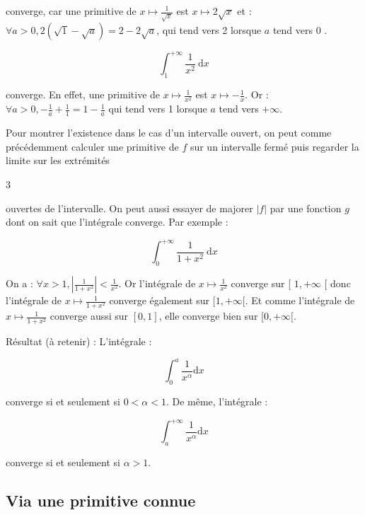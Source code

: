 converge, car une primitive de $x \mapsto \frac{1}{\sqrt{x}}$ est $x \mapsto 2 \sqrt{x}$ et : $\forall a>0,2(\sqrt{1}-\sqrt{a})=2-2 \sqrt{a}$, qui tend vers 2 lorsque $a$ tend vers 0 .

$$
\int_1^{+\infty} \frac{1}{x^2} \mathrm{~d} x
$$

converge. En effet, une primitive de $x \mapsto \frac{1}{x^2}$ est $x \mapsto-\frac{1}{x}$. Or : $\forall a>0,-\frac{1}{a}+\frac{1}{1}=1-\frac{1}{a}$ qui tend vers 1 lorsque $a$ tend vers $+\infty$.

Pour montrer l'existence dans le cas d'un intervalle ouvert, on peut comme précédemment calculer une primitive de $f$ sur un intervalle fermé puis regarder la limite sur les extrémités

3

ouvertes de l'intervalle. On peut aussi essayer de majorer $|f|$ par une fonction $g$ dont on sait que l'intégrale converge. Par exemple :

$$
\int_0^{+\infty} \frac{1}{1+x^2} \mathrm{~d} x
$$


On a : $\forall x>1,\left|\frac{1}{1+x^2}\right|<\frac{1}{x^2}$. Or l'intégrale de $x \mapsto \frac{1}{x^2}$ converge sur [ $1,+\infty$ [ donc l'intégrale de $x \mapsto \frac{1}{1+x^2}$ converge également sur $[1,+\infty[$. Et comme l'intégrale de $x \mapsto \frac{1}{1+x^2}$ converge aussi sur $[0,1]$, elle converge bien sur $[0,+\infty[$.

Résultat (à retenir) : L'intégrale :

$$
\int_0^a \frac{1}{x^\alpha} \mathrm{d} x
$$

converge si et seulement si $0<\alpha<1$.
De même, l'intégrale :

$$
\int_a^{+\infty} \frac{1}{x^\alpha} \mathrm{d} x
$$

converge si et seulement si $\alpha>1$.

\subsection{Via une primitive connue}

